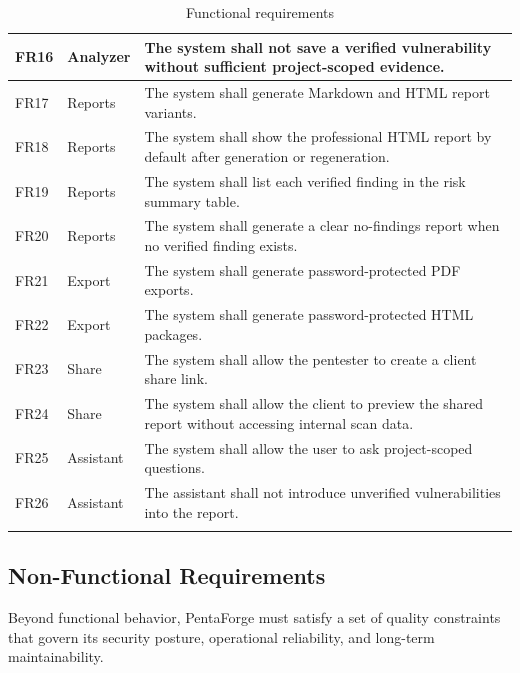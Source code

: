 \documentclass[12pt,a4paper]{report}
\begin{document}
\begin{longtable}{|p{}|p{}|p{}|}
\hline
FR16 & Analyzer & The system shall not save a verified vulnerability without
sufficient project-scoped evidence. \\
\hline
FR17 & Reports & The system shall generate Markdown and HTML report
variants. \\
\hline
FR18 & Reports & The system shall show the professional HTML report by
default after generation or regeneration. \\
\hline
FR19 & Reports & The system shall list each verified finding in the risk
summary table. \\
\hline
FR20 & Reports & The system shall generate a clear no-findings report when
no verified finding exists. \\
\hline
FR21 & Export & The system shall generate password-protected PDF exports. \\
\hline
FR22 & Export & The system shall generate password-protected HTML
packages. \\
\hline
FR23 & Share & The system shall allow the pentester to create a client share
link. \\
\hline
FR24 & Share & The system shall allow the client to preview the shared report
without accessing internal scan data. \\
\hline
FR25 & Assistant & The system shall allow the user to ask project-scoped
questions. \\
\hline
FR26 & Assistant & The assistant shall not introduce unverified
vulnerabilities into the report. \\
\hline
\caption{Functional requirements}
\label{tab:functional_requirements}
\end{longtable}

\subsection{Non-Functional Requirements}

Beyond functional behavior, PentaForge must satisfy a set of quality
constraints that govern its security posture, operational reliability, and
long-term maintainability.
\end{document}

